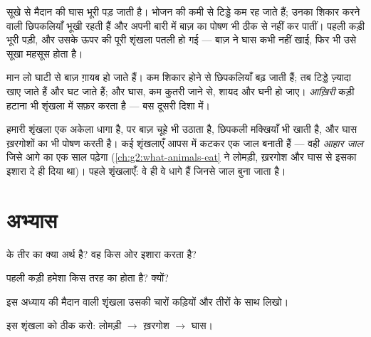 \begin{example}[सूखी गर्मी]\label{ex:g3:food-chains:dry}
सूखे से मैदान की घास भूरी पड़ जाती है। भोजन की कमी से टिड्डे कम रह जाते
हैं; उनका शिकार करने वाली छिपकलियाँ भूखी रहती हैं और अपनी बारी में
बाज़ का पोषण भी ठीक से नहीं कर पातीं। पहली कड़ी भूरी पड़ी, और उसके ऊपर
की पूरी शृंखला पतली हो गई --- बाज़ ने घास कभी नहीं खाई, फिर भी उसे सूखा
महसूस होता है।
\end{example}

\begin{example}[शिकारी को हटाना]\label{ex:g3:food-chains:hunter}
मान लो घाटी से बाज़ ग़ायब हो जाते हैं। कम शिकार होने से छिपकलियाँ बढ़
जाती हैं; तब टिड्डे ज़्यादा खाए जाते हैं और घट जाते हैं; और घास, कम
कुतरी जाने से, शायद और घनी हो जाए। \emph{आख़िरी} कड़ी हटाना भी शृंखला
में सफ़र करता है --- बस दूसरी दिशा में।
\end{example}

\begin{remark}[असली मैदान जाल होते हैं]\label{rem:g3:food-chains:web}
हमारी शृंखला एक अकेला धागा है, पर बाज़ चूहे भी उठाता है, छिपकली
मक्खियाँ भी खाती है, और घास ख़रगोशों का भी पोषण करती है। कई शृंखलाएँ
आपस में कटकर एक जाल बनाती हैं --- वही \emph{आहार जाल} जिसे आगे का एक
साल पढ़ेगा (\cref{ch:g2:what-animals-eat} ने लोमड़ी, ख़रगोश और घास से
इसका इशारा दे ही दिया था)। पहले शृंखलाएँ: वे ही वे धागे हैं जिनसे जाल
बुना जाता है।
\end{remark}

\section{अभ्यास}

\begin{exercise}[$\star$]\label{exo:g3:food-chains:1}
 के तीर का क्या अर्थ है? वह किस ओर इशारा करता है?
\end{exercise}

\begin{exercise}[$\star$]\label{exo:g3:food-chains:2}
पहली कड़ी हमेशा किस तरह का  होता है? क्यों?
\end{exercise}

\begin{exercise}[$\star$]\label{exo:g3:food-chains:3}
इस अध्याय की मैदान वाली शृंखला उसकी चारों कड़ियों और तीरों के साथ
लिखो।
\end{exercise}

\begin{exercise}[$\star$]\label{exo:g3:food-chains:4}
इस शृंखला को ठीक करो: लोमड़ी $\rightarrow$ ख़रगोश $\rightarrow$
घास।
\end{exercise}

